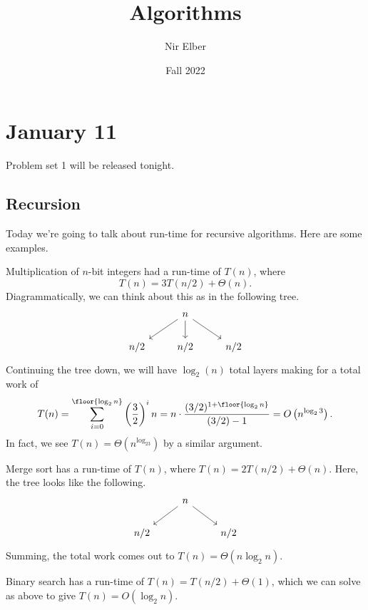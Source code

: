 \documentclass{article}
\title{Algorithms}
\author{Nir Elber}
\date{Fall 2022}
\begin{document}
\maketitle

\tableofcontents

\section{January 11}
Problem set 1 will be released tonight.

\subsection{Recursion}
Today we're going to talk about run-time for recursive algorithms. Here are some examples.
\begin{example}
	Multiplication of $n$-bit integers had a run-time of $T(n)$, where
	\[T(n)=3T(n/2)+\Theta(n).\]
	Diagrammatically, we can think about this as in the following tree.
	\[\begin{tikzcd}
		& n \\
		{n/2} & {n/2} & {n/2}
		\arrow[from=1-2, to=2-1]
		\arrow[from=1-2, to=2-2]
		\arrow[from=1-2, to=2-3]
	\end{tikzcd}\]
	Continuing the tree down, we will have $\log_2(n)$ total layers making for a total work of
	\[T(n)=\sum_{i=0}^{\floor{\log_2n}}\left(\frac32\right)^in=n\cdot\frac{(3/2)^{1+\floor{\log_2n}}}{(3/2)-1}=O\left(n^{\log_23}\right).\]
	In fact, we see $T(n)=\Theta\left(n^{\log_23}\right)$ by a similar argument.
\end{example}
\begin{example}
	Merge sort has a run-time of $T(n)$, where $T(n)=2T(n/2)+\Theta(n)$. Here, the tree looks like the following.
	\[\begin{tikzcd}
		& n \\
		{n/2} && {n/2}
		\arrow[from=1-2, to=2-1]
		\arrow[from=1-2, to=2-3]
	\end{tikzcd}\]
	Summing, the total work comes out to $T(n)=\Theta(n\log_2n)$.
\end{example}
\begin{example}
	Binary search has a run-time of $T(n)=T(n/2)+\Theta(1)$, which we can solve as above to give $T(n)=O(\log_2n)$.
\end{example}
\end{document}
